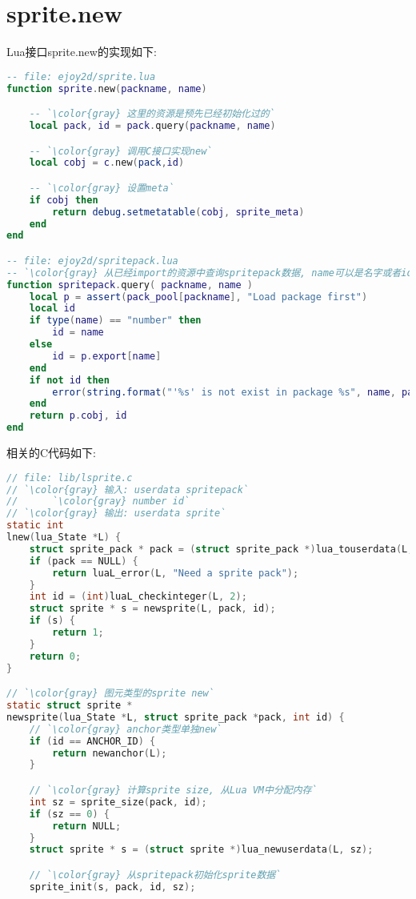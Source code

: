 \section {\ZHH sprite.new} {
    {Lua接口sprite.new的实现如下: }\par
\begin{lstlisting}[language=lua]
-- file: ejoy2d/sprite.lua
function sprite.new(packname, name)

    -- `\color{gray} 这里的资源是预先已经初始化过的`
    local pack, id = pack.query(packname, name)

    -- `\color{gray} 调用C接口实现new`
    local cobj = c.new(pack,id)

    -- `\color{gray} 设置meta`
    if cobj then
        return debug.setmetatable(cobj, sprite_meta)
    end
end

-- file: ejoy2d/spritepack.lua
-- `\color{gray} 从已经import的资源中查询spritepack数据, name可以是名字或者id`
function spritepack.query( packname, name )
    local p = assert(pack_pool[packname], "Load package first")
    local id
    if type(name) == "number" then
        id = name
    else
        id = p.export[name]
    end
    if not id then
        error(string.format("'%s' is not exist in package %s", name, packname))
    end
    return p.cobj, id
end
\end{lstlisting}

    {相关的C代码如下:} \par
\begin{lstlisting}[language=C]
// file: lib/lsprite.c
// `\color{gray} 输入: userdata spritepack`
//      `\color{gray} number id`
// `\color{gray} 输出: userdata sprite`
static int
lnew(lua_State *L) {
    struct sprite_pack * pack = (struct sprite_pack *)lua_touserdata(L, 1);
    if (pack == NULL) {
        return luaL_error(L, "Need a sprite pack");
    }
    int id = (int)luaL_checkinteger(L, 2);
    struct sprite * s = newsprite(L, pack, id);
    if (s) {
        return 1;
    }
    return 0;
}

// `\color{gray} 图元类型的sprite new`
static struct sprite *
newsprite(lua_State *L, struct sprite_pack *pack, int id) {
    // `\color{gray} anchor类型单独new`
    if (id == ANCHOR_ID) {
        return newanchor(L);
    }

    // `\color{gray} 计算sprite size, 从Lua VM中分配内存`
    int sz = sprite_size(pack, id);
    if (sz == 0) {
        return NULL;
    }
    struct sprite * s = (struct sprite *)lua_newuserdata(L, sz);

    // `\color{gray} 从spritepack初始化sprite数据`
    sprite_init(s, pack, id, sz);


\end{lstlisting}}
